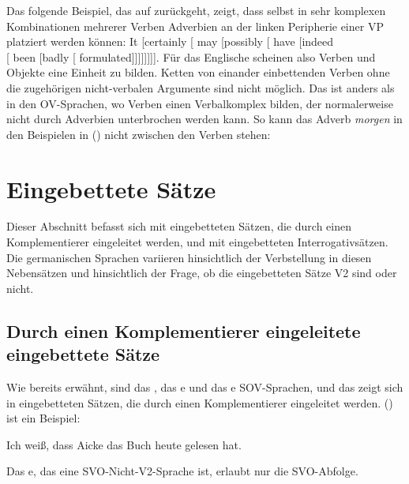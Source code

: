 Das folgende Beispiel, das auf \citet[§ 8.20, 495]{QGLS85a-u} zurückgeht, zeigt, dass selbst in sehr
komplexen Kombinationen mehrerer Verben Adverbien an der linken Peripherie einer VP platziert werden können:
\ea
It [certainly [ may [possibly [ have [indeed\\ \hfill{}[ been {}[badly [ formulated]]]]]]]].
\z
Für das Englische scheinen also Verben und Objekte eine Einheit zu bilden. Ketten von einander
einbettenden Verben ohne die zugehörigen nicht-verbalen Argumente sind nicht möglich.
Das ist anders als in den OV-Sprachen, wo Verben einen Verbalkomplex bilden, der normalerweise nicht
durch Adverbien unterbrochen werden kann. So kann das Adverb \emph{morgen} in den Beispielen in
() nicht zwischen den Verben stehen:
\eal
{}
\zl
{}

\section{Eingebettete Sätze}
\label{sec-embeeded-clauses}

Dieser Abschnitt befasst sich mit eingebetteten Sätzen, die durch einen Komplementierer eingeleitet werden, und mit
eingebetteten Interrogativsätzen. Die germanischen Sprachen variieren hinsichtlich der Verbstellung in
diesen Nebensätzen und hinsichtlich der Frage, ob die eingebetteten Sätze V2 sind oder nicht.

\subsection{Durch einen Komplementierer eingeleitete eingebettete Sätze}

Wie bereits erwähnt, sind das , das e und das e SOV-Sprachen, und das zeigt sich in eingebetteten
Sätzen, die durch einen Komplementierer eingeleitet werden. () ist ein Beispiel:

\ea
Ich weiß, dass Aicke das Buch heute gelesen hat.
\z

\noindent
Das e, das eine SVO-Nicht-V2-Sprache ist, erlaubt nur die SVO-Abfolge.
\z

